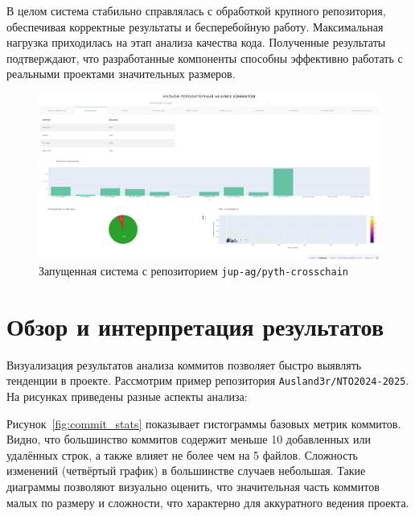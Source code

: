 В целом система стабильно справлялась с обработкой крупного репозитория, обеспечивая корректные результаты и бесперебойную работу. Максимальная нагрузка приходилась на этап анализа качества кода. Полученные результаты подтверждают, что разработанные компоненты способны эффективно работать с реальными проектами значительных размеров.

\begin{figure}[ht]
	\centering
	\includegraphics[width=\textwidth]{my_folder/images/nagruzka.png}
	\caption{Запущенная система с репозиторием \texttt{jup-ag/pyth-crosschain}}
	\label{tab:nagruzka}
\end{figure}

\section{Обзор и интерпретация результатов}
Визуализация результатов анализа коммитов позволяет быстро выявлять тенденции в проекте. Рассмотрим пример репозитория \texttt{Ausland3r/NTO2024-2025}. На рисунках приведены разные аспекты анализа:

Рисунок~\ref{fig:commit_stats} показывает гистограммы базовых метрик коммитов. Видно, что большинство коммитов содержит меньше 10 добавленных или удалённых строк, а также влияет не более чем на 5 файлов. Сложность изменений (четвёртый график) в большинстве случаев небольшая. Такие диаграммы позволяют визуально оценить, что значительная часть коммитов малых по размеру и сложности, что характерно для аккуратного ведения проекта. 

